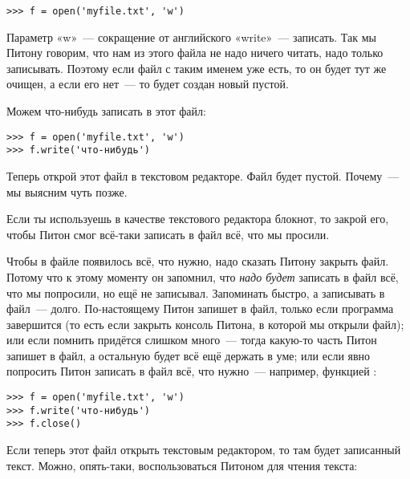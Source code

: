 \begin{listing}
\begin{verbatim}
>>> f = open('myfile.txt', 'w')
\end{verbatim}
\end{listing}

Параметр «w» — сокращение от английского «write» — записать. Так мы Питону говорим, что нам из этого файла не надо ничего читать, надо только записывать. Поэтому если файл с таким именем уже есть, то он будет тут же очищен, а если его нет — то будет создан новый пустой.

Можем что-нибудь записать в этот файл:

\begin{listing}
\begin{verbatim}
>>> f = open('myfile.txt', 'w')
>>> f.write('что-нибудь')
\end{verbatim}
\end{listing}

Теперь открой этот файл в текстовом редакторе. Файл будет пустой. Почему — мы выясним чуть позже.

\begin{WINDOWS}
Если ты используешь в качестве текстового редактора блокнот, то закрой его, чтобы Питон смог всё-таки записать в файл всё, что мы просили.
\end{WINDOWS}

Чтобы в файле появилось всё, что нужно, надо сказать Питону закрыть файл. Потому что к этому моменту он запомнил, что \emph{надо будет} записать в файл  всё, что мы попросили, но ещё не записывал. Запоминать быстро, а записывать в файл — долго. По-настоящему Питон запишет в файл, только если программа завершится (то есть если закрыть консоль Питона, в которой мы открыли файл); или если помнить придётся слишком много — тогда какую-то часть Питон запишет в файл, а остальную будет всё ещё держать в уме; или если явно попросить Питон записать в файл всё, что нужно — например, функцией :

\begin{listing}
\begin{verbatim}
>>> f = open('myfile.txt', 'w')
>>> f.write('что-нибудь')
>>> f.close()
\end{verbatim}
\end{listing}

Если теперь этот файл открыть текстовым редактором, то там будет записанный текст. Можно, опять-таки, воспользоваться Питоном для чтения текста:

